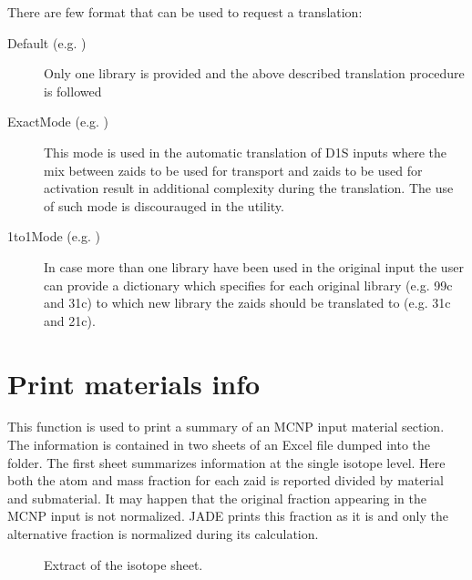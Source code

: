 \documentclass[letterpaper,10pt,english]{sphinxmanual}
\let\sphinxpxdimen\pdfpxdimen\else\newdimen\sphinxpxdimen
\begin{document}
\sphinxAtStartPar
There are few format that can be used to request a translation:
\begin{description}
\item[{Default (e.g. )}] \leavevmode
\sphinxAtStartPar
Only one library is provided and the above described translation
procedure is followed

\item[{ExactMode (e.g. )}] \leavevmode
\sphinxAtStartPar
This mode is used in the automatic translation of D1S inputs where
the mix between zaids to be used for transport and zaids to be used
for activation result in additional complexity during the translation.
The use of such mode is discourauged in the  utility.

\item[{1to1Mode (e.g. )}] \leavevmode
\sphinxAtStartPar
In case more than one library have been used in the original input the
user can provide a dictionary which specifies for each original library
(e.g. 99c and 31c) to which new library the zaids should be translated to
(e.g. 31c and 21c).

\end{description}


\section{Print materials info}
\label{\detokenize{usage/utilities:print-materials-info}}
\sphinxAtStartPar
{}

\sphinxAtStartPar
This function is used to print a summary of an MCNP input material section.
The information is contained in two sheets of an Excel file dumped into the
 folder.
The first sheet summarizes information at the single isotope level.
Here both the atom and mass fraction for each zaid is reported divided by
material and submaterial. It may happen that the original fraction appearing
in the MCNP input is not normalized. JADE prints this fraction as it is and
only the alternative fraction is normalized during its calculation.

\begin{figure}[htbp]
\centering
\capstart

\noindent\sphinxincludegraphics[width=600\sphinxpxdimen]{{printmat1}.jpg}
\caption{Extract of the isotope sheet.}\label{\detokenize{usage/utilities:id3}}\end{figure}
\end{document}
